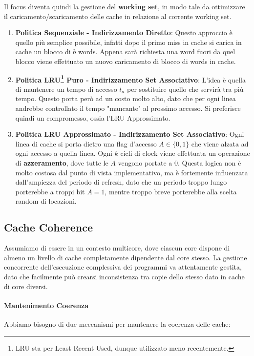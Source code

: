 \documentclass{article}
\begin{document}
Il focus diventa quindi la gestione del \textbf{working set}, in modo tale da ottimizzare il caricamento/scaricamento delle cache in relazione al corrente working set.

\begin{enumerate}
    \item \textbf{Politica Sequenziale - Indirizzamento Diretto}: Questo approccio è quello più semplice possibile, infatti dopo il primo miss in cache si carica in cache un blocco di $b$ words. Appena sarà richiesta una word fuori da quel blocco viene effettuato un nuovo caricamento di blocco di words in cache.
    \item \textbf{Politica LRU\footnote{LRU sta per Least Recent Used, dunque utilizzato meno recentemente.} Puro - Indirizzamento Set Associativo}: L'idea è quella di mantenere un tempo di accesso $t_{a}$ per sostituire quello che servirà tra più tempo. Questo porta però ad un costo molto alto, dato che per ogni linea andrebbe controllato il tempo "mancante" al prossimo accesso. Si preferisce quindi un compromesso, ossia l'LRU Approssimato.
    \item \textbf{Politica LRU Approssimato - Indirizzamento Set Associativo}: Ogni linea di cache si porta dietro una flag d'accesso $A \in \{ 0,1 \}$ che viene alzata ad ogni accesso a quella linea. Ogni $k$ cicli di clock viene effettuata un operazione di \textbf{azzeramento}, dove tutte le $A$ vengono portate a $0$. Questa logica non è molto costosa dal punto di vista implementativo, ma è fortemente influenzata dall'ampiezza del periodo di refresh, dato che un periodo troppo lungo porterebbe a troppi bit $A=1$, mentre troppo breve porterebbe alla scelta random di locazioni.
\end{enumerate}

\newpage

\subsection{Cache Coherence}

Assumiamo di essere in un contesto multicore, dove ciascun core dispone di almeno un livello di cache completamente dipendente dal core stesso. La gestione concorrente dell'esecuzione complessiva dei programmi va attentamente gestita, dato che facilmente può crearsi inconsistenza tra copie dello stesso dato in cache di core diversi.

\paragraph{Mantenimento Coerenza} Abbiamo bisogno di due meccanismi per mantenere la coerenza delle cache:
\end{document}
